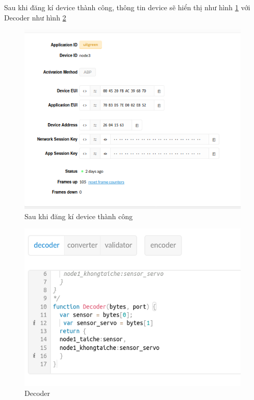 Sau khi đăng kí device thành công, thông tin device sẽ hiển thị như hình \ref{fig:device_profile} với Decoder như hình \ref{fig:device_decoder}
\begin{figure}[H]
    \centering
    \includegraphics[width=\textwidth]{images/Quanh/Device_profile.png}
    \caption{Sau khi đăng kí device thành công}
    \label{fig:device_profile}
\end{figure}
\begin{figure}[H]
    \centering
    \includegraphics[width=\textwidth]{images/Quanh/decoder.png} 
    \caption{Decoder}
    \label{fig:device_decoder}
\end{figure}


